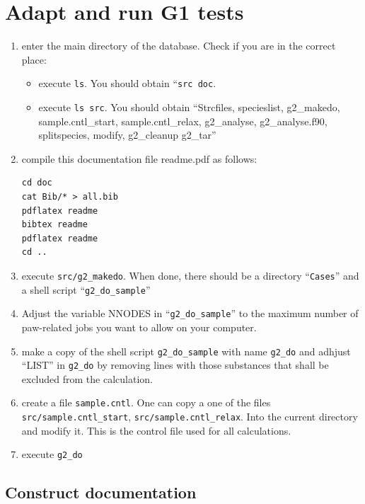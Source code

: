 \documentclass{book}
\begin{document}
\section*{Adapt and run G1 tests}
\begin{enumerate}
\item enter the main directory of the database. Check if you are in
  the correct place:
  \begin{itemize} 
    \item execute \verb|ls|. You should obtain ``\verb|src doc|. 
    \item execute \verb|ls src|. You should obtain ``Strcfiles,
      specieslist, g2\_makedo, sample.cntl\_start,
      sample.cntl\_relax, g2\_analyse, g2\_analyse.f90, splitspecies, 
      modify, g2\_cleanup g2\_tar''
   \end{itemize}
%
\item compile this documentation file readme.pdf as follows:
\begin{verbatim}
cd doc
cat Bib/* > all.bib
pdflatex readme
bibtex readme
pdflatex readme
cd ..
\end{verbatim}
%
\item execute \verb|src/g2_makedo|. When done, there should be a
  directory ``\verb|Cases|'' and a shell script ``\verb|g2_do_sample|''
%
\item Adjust the variable NNODES in ``\verb|g2_do_sample|'' to the
  maximum number of paw-related jobs you want to allow on your
  computer.
%
\item make a copy of the shell script \verb|g2_do_sample| with name
  \verb|g2_do| and adhjust ``LIST'' in \verb|g2_do| by removing lines
  with those substances that shall be excluded from the calculation.
%
\item create a file \verb|sample.cntl|. One can copy a one of the
  files \verb|src/sample.cntl_start|,
  \verb|src/sample.cntl_relax|. Into the current directory and modify
  it. This is the control file used for all calculations.
%
\item execute \verb|g2_do|
%
\end{enumerate}

\subsection*{Construct documentation}
\end{document}
